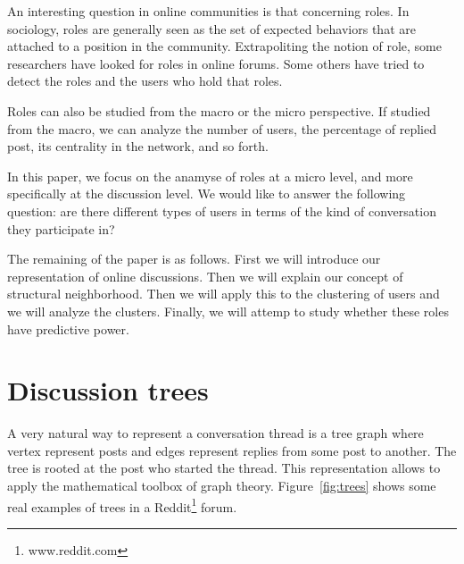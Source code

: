 \documentclass[smallextended]{svjour3}          %
\begin{document}
An interesting question in online communities is that concerning roles. In sociology, roles are generally seen as the set of expected behaviors that are attached  to a position in the community. Extrapoliting the notion of role, some researchers have looked for roles in online forums. Some others have tried to detect the roles and the users who hold that roles.

Roles can also be studied from the macro or the micro perspective. If studied from the macro, we can analyze the number of users, the percentage of replied post, its centrality in the network, and  so forth.

In this paper, we focus on the anamyse of roles at a micro level, and more specifically at the discussion level. We would like to answer the following question: are there different types of users in terms of the kind of conversation they participate in?

The remaining of the paper is as follows. First we will introduce our representation of online discussions. Then we will explain our concept of structural neighborhood. Then we will apply this to the clustering of users and we will analyze the clusters. Finally, we will attemp to study whether these roles have predictive power.


\section{Discussion trees}
A very natural way to represent a conversation thread is a tree graph where vertex represent posts and edges represent replies from some post to another. The tree is rooted at the post who started the thread. This representation allows to apply the mathematical toolbox of graph theory. Figure~\ref{fig:trees} shows some real examples of trees in a Reddit\footnote{www.reddit.com} forum.
\end{document}

